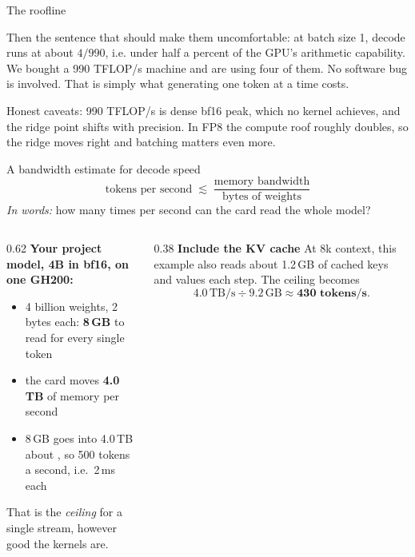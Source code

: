 \documentclass[aspectratio=169,10pt]{beamer}
\begin{document}
\begin{frame}[shrink=6]{The roofline}
{  Then the sentence that should make them uncomfortable: at batch size 1,
  decode runs at about $4/990$, i.e. under half a percent of the GPU's
  arithmetic capability. We bought a 990 TFLOP/s machine and are using four of
  them. No software bug is involved. That is simply what generating one token
  at a time costs.

  Honest caveats: 990 TFLOP/s is dense bf16 peak, which no kernel achieves, and
  the ridge point shifts with precision. In FP8 the compute roof roughly
  doubles, so the ridge moves right and batching matters even more.}
\end{frame}

\begin{frame}{A bandwidth estimate for decode speed}
  \[
    \text{tokens per second} \;\lesssim\;
    \frac{\text{memory bandwidth}}{\text{bytes of weights}}
  \]
  \emph{In words:} how many times per second can the card read the whole model?
  \vspace{0.2em}
  \begin{columns}[T]
    \begin{column}{0.62\textwidth}
      \textbf{Your project model, 4B in bf16, on one GH200:}
      \begin{itemize}\small
        \item 4 billion weights, 2 bytes each: \textbf{8\,GB} to read for
          every single token
        \item the card moves \textbf{4.0\,TB} of memory per second
        \item 8\,GB goes into 4.0\,TB about , so 500 tokens a
          second, i.e.\ 2\,ms each
      \end{itemize}
      \vspace{0.2em}
      That is the \emph{ceiling} for a single stream, however good the kernels
      are.
    \end{column}
    \begin{column}{0.38\textwidth}
      \textbf{Include the KV cache}
      \vspace{0.2em}
      \small
      At 8k context, this example also reads about 1.2\,GB of cached keys and
      values each step. The ceiling becomes
      \[
        4.0\,\mathrm{TB/s} \div 9.2\,\mathrm{GB}
        \approx \textbf{430 tokens/s}.
      \]
    \end{column}
  \end{columns}
\end{frame}
\end{document}
